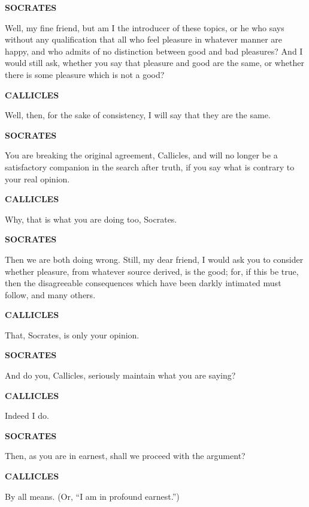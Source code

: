 \documentclass[11pt,letter]{article}
\begin{document}
\par \textbf{SOCRATES}
\par   Well, my fine friend, but am I the introducer of these topics, or he who says without any qualification that all who feel pleasure in whatever manner are happy, and who admits of no distinction between good and bad pleasures? And I would still ask, whether you say that pleasure and good are the same, or whether there is some pleasure which is not a good?

\par \textbf{CALLICLES}
\par   Well, then, for the sake of consistency, I will say that they are the same.

\par \textbf{SOCRATES}
\par   You are breaking the original agreement, Callicles, and will no longer be a satisfactory companion in the search after truth, if you say what is contrary to your real opinion.

\par \textbf{CALLICLES}
\par   Why, that is what you are doing too, Socrates.

\par \textbf{SOCRATES}
\par   Then we are both doing wrong. Still, my dear friend, I would ask you to consider whether pleasure, from whatever source derived, is the good; for, if this be true, then the disagreeable consequences which have been darkly intimated must follow, and many others.

\par \textbf{CALLICLES}
\par   That, Socrates, is only your opinion.

\par \textbf{SOCRATES}
\par   And do you, Callicles, seriously maintain what you are saying?

\par \textbf{CALLICLES}
\par   Indeed I do.

\par \textbf{SOCRATES}
\par   Then, as you are in earnest, shall we proceed with the argument?

\par \textbf{CALLICLES}
\par   By all means. (Or, “I am in profound earnest.”)
\end{document}
